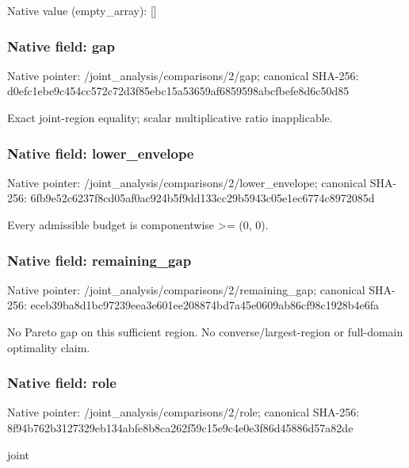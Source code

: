 \documentclass[10pt,a4paper]{article}
\begin{document}
Native value (empty\_\allowbreak{}array): []

\subsubsection{Native field: gap}
Native pointer: /joint\_\allowbreak{}analysis/comparisons/2/gap; canonical SHA-256: d0efc1ebe9c454cc572c72d3f85ebc15a53659af6859598abcfbefe8d6c50d85

\begingroup\raggedright\sloppy Exact joint-region equality;\allowbreak{} scalar multiplicative ratio inapplicable.\par\endgroup

\subsubsection{Native field: lower\_\allowbreak{}envelope}
Native pointer: /joint\_\allowbreak{}analysis/comparisons/2/lower\_\allowbreak{}envelope; canonical SHA-256: 6fb9e52c6237f8cd05af0ac924b5f9dd133cc29b5943c05e1ec6774c8972085d

\begingroup\raggedright\sloppy Every admissible budget is componentwise >=\allowbreak{} (0,\allowbreak{} 0).\par\endgroup

\subsubsection{Native field: remaining\_\allowbreak{}gap}
Native pointer: /joint\_\allowbreak{}analysis/comparisons/2/remaining\_\allowbreak{}gap; canonical SHA-256: eceb39ba8d1bc97239eea3e601ee208874bd7a45e0609ab86cf98c1928b4e6fa

\begingroup\raggedright\sloppy No Pareto gap on this sufficient region. No converse/\allowbreak{}largest-region or full-domain optimality claim.\par\endgroup

\subsubsection{Native field: role}
Native pointer: /joint\_\allowbreak{}analysis/comparisons/2/role; canonical SHA-256: 8f94b762b3127329eb134abfe8b8ca262f59c15e9c4e0e3f86d45886d57a82de

\begingroup\raggedright\sloppy joint\par\endgroup
\end{document}

